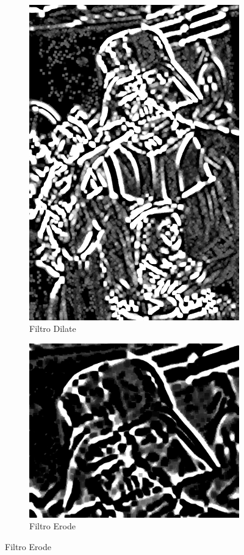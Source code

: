 \documentclass[12pt, a4paper]{article}
\begin{document}
\begin{figure}[!ht]
\begin{subfigure}{0.23\textwidth}
        \includegraphics[width=\textwidth]{img/dilate-res.png}
        \caption{Filtro Dilate}
    \end{subfigure}
    \hfill
    \begin{subfigure}{0.3\textwidth}
        \includegraphics[width=\textwidth]{img/erode-res.png}
        \caption{Filtro Erode}
    \end{subfigure}
\end{figure}
\end{document}
